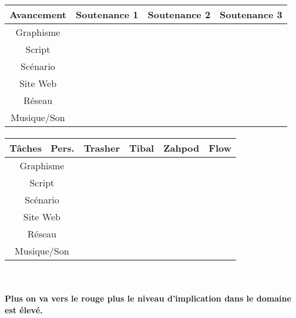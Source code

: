 \documentclass[12pt,a4paper]{article}
\begin{document}
\paragraph{}
\begin{center}
\begin{tabular}{|c|c|c|c|}
\hline 
\rowcolor{cyan} Avancement & Soutenance 1 & Soutenance 2 & Soutenance 3 \\ 
\hline 
\cellcolor{lightgray}Graphisme & \cellcolor{yellow} & \cellcolor{yellow} & \cellcolor{orange} \\ 
\hline 
\cellcolor{lightgray}Script & \cellcolor{yellow} &  \cellcolor{orange} & \cellcolor{red}  \\ 
\hline 
\cellcolor{lightgray}Scénario & \cellcolor{orange} &  \cellcolor{orange} &  \cellcolor{red} \\ 
\hline 
\cellcolor{lightgray}Site Web & \cellcolor{yellow} &  \cellcolor{orange} & \cellcolor{red}  \\ 
\hline
\cellcolor{lightgray}Réseau & \cellcolor{yellow} & \cellcolor{yellow} & \cellcolor{red} \\ 
\hline 
\cellcolor{lightgray}Musique/Son &  & \cellcolor{yellow} &  \cellcolor{orange}  \\ 
\hline 
\end{tabular}
\paragraph{}
\begin{tabular}{|c|c|c|c|c|}
 \hline 
 \rowcolor{cyan}Tâches \ Pers. & Trasher & Tibal & Zahpod & Flow \\ 
 \hline 
 \cellcolor{lightgray}Graphisme & \cellcolor{red} &  &  & \cellcolor{yellow} \\ 
 \hline 
 \cellcolor{lightgray}Script &  & \cellcolor{yellow} & \cellcolor{red} & \cellcolor{yellow} \\ 
 \hline 
 \cellcolor{lightgray}Scénario & \cellcolor{yellow} & \cellcolor{yellow} & \cellcolor{yellow} & \cellcolor{yellow} \\ 
 \hline 
 \cellcolor{lightgray}Site Web &  & \cellcolor{red} &  &  \\ 
 \hline 
 \cellcolor{lightgray} Réseau & \cellcolor{orange} &  & \cellcolor{yellow} & \cellcolor{red} \\ 
 \hline 
 \cellcolor{lightgray}Musique/Son &  & \cellcolor{yellow} &  & \cellcolor{yellow} \\ 
 \hline 
 \end{tabular}
 \
\paragraph{Plus on va vers le rouge plus le niveau d'implication dans le domaine est élevé.} 
\paragraph{}
 \begin{tabular}{|c|c|c|c|}
 \hline 
\cellcolor{white} & \cellcolor{yellow} & \cellcolor{orange} & \cellcolor{red} \\ 
 \hline 
 \end{tabular}

\end{center}
\newpage
\end{document}
